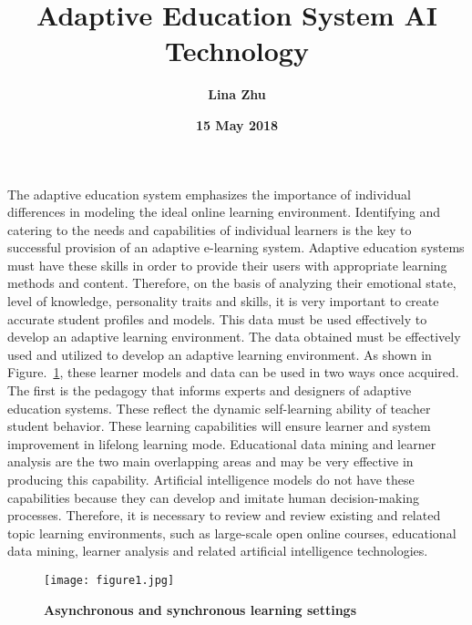 \documentclass[a4paper,12pt,twocolumn]{article}
\begin{document}
	
\title{\textbf{\bfseries \LARGE Adaptive Education System AI Technology} }
\author{\textbf{Lina Zhu}}
\date{\textbf{15 May 2018}}
\maketitle
	\par
	
	The adaptive education system emphasizes the importance of individual differences in modeling the ideal online learning environment. Identifying and catering to the needs and capabilities of individual learners is the key to successful provision of an adaptive e-learning system. Adaptive education systems must have these skills in order to provide their users with appropriate learning methods and content. Therefore, on the basis of analyzing their emotional state, level of knowledge, personality traits and skills, it is very important to create accurate student profiles and models. This data must be used effectively to develop an adaptive learning environment. The data obtained must be effectively used and utilized to develop an adaptive learning environment. As shown in Figure.~\ref{pic1}, these learner models and data can be used in two ways once acquired. The first is the pedagogy that informs experts and designers of adaptive education systems. These reflect the dynamic self-learning ability of teacher student behavior. These learning capabilities will ensure learner and system improvement in lifelong learning mode. Educational data mining and learner analysis are the two main overlapping areas and may be very effective in producing this capability. Artificial intelligence models do not have these capabilities because they can develop and imitate human decision-making processes. Therefore, it is necessary to review and review existing and related topic learning environments, such as large-scale open online courses, educational data mining, learner analysis and related artificial intelligence technologies.
	\begin{figure}[htp]
		\centering
		\texttt{[image: figure1.jpg]}
		\caption{\bfseries{	Asynchronous and synchronous learning settings}}\label{pic1}
	\end{figure}
\end{document}
